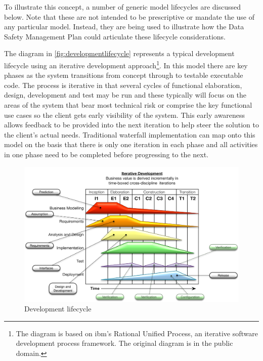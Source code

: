 To illustrate this concept, a number of generic model lifecycles are discussed below. Note that these are not intended to be prescriptive or mandate the use of any particular model. Instead, they are being used to illustrate how the Data Safety Management Plan could articulate these lifecycle considerations.

 The diagram in \autoref{fig:developmentlifecycle} represents a typical development lifecycle using an iterative development approach\footnote{The diagram is based on \gls{ibm}'s Rational Unified Process, an iterative software development process framework. The original diagram is in the public domain.}. In this model there are key phases as the system transitions from concept through to testable executable code. The process is iterative in that several cycles of functional elaboration, design, development and test may be run and these typically will focus on the areas of the system that bear most technical risk or comprise the key functional use cases so the client gets early visibility of the system. This early awareness allows feedback to be provided into the next iteration to help steer the solution to the client's actual needs. Traditional waterfall implementation can map onto this model on the basis that there is only one iteration in each phase and all activities in one phase need to be completed before progressing to the next.

\begin{figure}[htbp]
  \centering
  \includegraphics[width=\textwidth]{images/developmentlifecycleflat}
  \caption{Development lifecycle}
  \label{fig:developmentlifecycle}
\end{figure}

